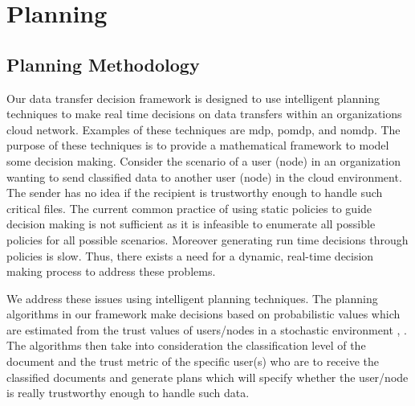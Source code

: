 \section{Planning}
\subsection{Planning Methodology}
Our data transfer decision framework is designed to use intelligent planning
techniques to make real time decisions on data transfers within an organizations cloud
network. Examples of these techniques are \gls{mdp}, \gls{pomdp}, and \gls{nomdp}.
The purpose of these techniques is to provide a mathematical framework
to model some decision making. Consider the scenario of a user (node) in an
organization wanting to send classified data to another user (node) in the cloud
environment. The sender has no idea if the recipient is trustworthy enough to
handle such critical files. The current common practice of using static policies to
guide decision making is not sufficient as it is infeasible to enumerate all
possible policies for all possible scenarios. Moreover generating run time
decisions through policies is slow. Thus, there exists a need for a dynamic,
real-time decision making process to address these problems. 

We address these issues using intelligent planning techniques. The planning
algorithms in our framework make decisions based on probabilistic values which
are estimated from the trust values of users/nodes in a stochastic environment
\autocite{JMarecki2012}, \autocite{JWu.2011}. The algorithms then take into consideration the classification level
of the document and the trust metric of the specific user(s) who are to receive
the classified documents and generate plans which will specify whether the
user/node is really trustworthy enough to handle such data.  

